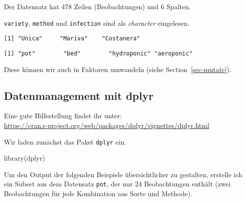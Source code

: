 \documentclass[
  letterpaper,
  DIV=11,
  numbers=noendperiod]{scrartcl}
\newenvironment{Shaded}{\begin{snugshade}}{\end{snugshade}}
\newcommand{\FunctionTok}[1]{\textcolor[rgb]{0.28,0.35,0.67}{#1}}
\newcommand{\NormalTok}[1]{\textcolor[rgb]{0.00,0.23,0.31}{#1}}
\newcommand{\SpecialCharTok}[1]{\textcolor[rgb]{0.37,0.37,0.37}{#1}}
\begin{document}
Der Datensatz hat 478 Zeilen (Beobachtungen) und 6 Spalten.

\texttt{variety}, \texttt{method} und \texttt{infection} sind als
\emph{character} eingelesen.

\begin{Shaded}
\end{Shaded}

\begin{verbatim}
[1] "Unica"     "Mariva"    "Costanera"
\end{verbatim}

\begin{Shaded}
\end{Shaded}

\begin{verbatim}
[1] "pot"        "bed"        "hydroponic" "aeroponic" 
\end{verbatim}

Diese können wir auch in Faktoren umwandeln (siehe
Section~\ref{sec-mutate}).

\hypertarget{datenmanagement-mit-dplyr}{%
\subsection{Datenmanagement mit dplyr}\label{datenmanagement-mit-dplyr}}

Eine gute Hilfestellung findet ihr unter:\\
\url{https://cran.r-project.org/web/packages/dplyr/vignettes/dplyr.html}

Wir laden zunächst das Paket \texttt{dplyr} ein.

\begin{Shaded}
\begin{Highlighting}[]
\FunctionTok{library}\NormalTok{(dplyr)}
\end{Highlighting}
\end{Shaded}

Um den Output der folgenden Beispiele übersichtlicher zu gestalten,
erstelle ich ein Subset aus dem Datensatz \texttt{pot}, der nur 24
Beobachtungen enthält (zwei Beobachtungen für jede Kombination aus Sorte
und Methode).
\end{document}

